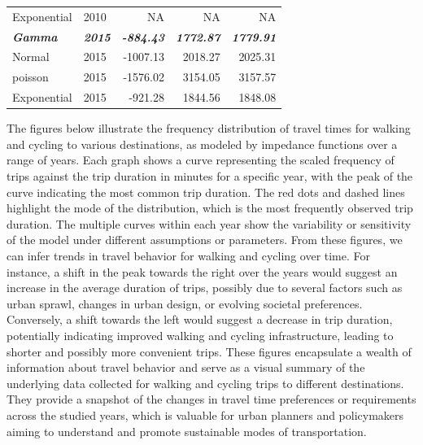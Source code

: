 \documentclass[
11pt, %
oneside, %
english, %
singlespacing, %
]{macthesis} %
\begin{document}
\begin{table}
\begin{tabular}{llrrr}
\hspace{1em}Exponential & 2010 & NA & NA & NA\\
\begingroup\fontsize{9}{11}\selectfont \em{\textbf{\hspace{1em}Gamma}}\endgroup & \begingroup\fontsize{9}{11}\selectfont \em{\textbf{2015}}\endgroup & \begingroup\fontsize{9}{11}\selectfont \em{\textbf{-884.43}}\endgroup & \begingroup\fontsize{9}{11}\selectfont \em{\textbf{1772.87}}\endgroup & \begingroup\fontsize{9}{11}\selectfont \em{\textbf{1779.91}}\endgroup\\
\hspace{1em}Normal & 2015 & -1007.13 & 2018.27 & 2025.31\\
\hspace{1em}poisson & 2015 & -1576.02 & 3154.05 & 3157.57\\
\hspace{1em}Exponential & 2015 & -921.28 & 1844.56 & 1848.08\\
\bottomrule
\end{tabular}
\endgroup{}
\end{table}

\newpage

The figures below illustrate the frequency distribution of travel times for walking and cycling to various destinations, as modeled by impedance functions over a range of years. Each graph shows a curve representing the scaled frequency of trips against the trip duration in minutes for a specific year, with the peak of the curve indicating the most common trip duration. The red dots and dashed lines highlight the mode of the distribution, which is the most frequently observed trip duration. The multiple curves within each year show the variability or sensitivity of the model under different assumptions or parameters.
From these figures, we can infer trends in travel behavior for walking and cycling over time. For instance, a shift in the peak towards the right over the years would suggest an increase in the average duration of trips, possibly due to several factors such as urban sprawl, changes in urban design, or evolving societal preferences. Conversely, a shift towards the left would suggest a decrease in trip duration, potentially indicating improved walking and cycling infrastructure, leading to shorter and possibly more convenient trips.
These figures encapsulate a wealth of information about travel behavior and serve as a visual summary of the underlying data collected for walking and cycling trips to different destinations. They provide a snapshot of the changes in travel time preferences or requirements across the studied years, which is valuable for urban planners and policymakers aiming to understand and promote sustainable modes of transportation.
\end{document}
